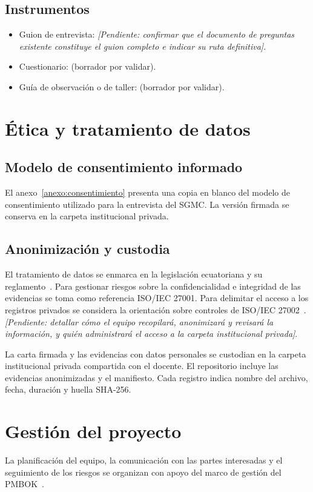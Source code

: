 \documentclass[11pt,a4paper]{article}
\newcommand{\pendiente}[1]{\textit{[Pendiente: #1]}}
\begin{document}
\subsection{Instrumentos}
\begin{itemize}
  \item Guion de entrevista: \pendiente{confirmar que el documento de preguntas existente constituye el guion completo e indicar su ruta definitiva}.
  \item Cuestionario:  (borrador por validar).
  \item Guía de observación o de taller:  (borrador por validar).
\end{itemize}

\section{Ética y tratamiento de datos}

\subsection{Modelo de consentimiento informado}
El anexo~\ref{anexo:consentimiento} presenta una copia en blanco del
modelo de consentimiento utilizado para la entrevista del SGMC.
La versión firmada se conserva en la carpeta institucional privada.

\subsection{Anonimización y custodia}
El tratamiento de datos se enmarca en la legislación ecuatoriana y su reglamento~\cite{lopdp,reg904}. Para gestionar riesgos sobre la confidencialidad e integridad de las evidencias se toma como referencia ISO/IEC 27001. Para delimitar el acceso a los registros privados se considera la orientación sobre controles de ISO/IEC 27002~\cite{iso27001,iso27002}.
\pendiente{detallar cómo el equipo recopilará, anonimizará y revisará la información, y quién administrará el acceso a la carpeta institucional privada}.

\par La carta firmada y las evidencias con datos personales se custodian en la carpeta institucional privada compartida con el docente. El repositorio incluye las evidencias anonimizadas y el manifiesto. Cada registro indica nombre del archivo, fecha, duración y huella SHA-256.

\section{Gestión del proyecto}
La planificación del equipo, la comunicación con las partes interesadas y el seguimiento de los riesgos se organizan con apoyo del marco de gestión del PMBOK~\cite{pmbok}.
\end{document}
